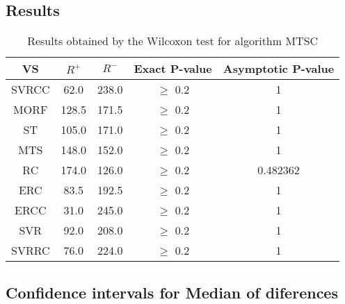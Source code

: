 \documentclass[a4paper,10pt]{article}
\begin{document}
\subsection{Results}

\begin{table}[!htp]
\centering\small
\begin{tabular}{
|c|c|c|c|c|}
\hline
 VS & $R^{+}$ & $R^{-}$ & Exact P-value & Asymptotic P-value \\ \hline 
SVRCC & 62.0 & 238.0 & $\geq$ 0.2 & 1\\ \hline 
MORF & 128.5 & 171.5 & $\geq$ 0.2 & 1\\ \hline 
ST & 105.0 & 171.0 & $\geq$ 0.2 & 1\\ \hline 
MTS & 148.0 & 152.0 & $\geq$ 0.2 & 1\\ \hline 
RC & 174.0 & 126.0 & $\geq$ 0.2 & 0.482362\\ \hline 
ERC & 83.5 & 192.5 & $\geq$ 0.2 & 1\\ \hline 
ERCC & 31.0 & 245.0 & $\geq$ 0.2 & 1\\ \hline 
SVR & 92.0 & 208.0 & $\geq$ 0.2 & 1\\ \hline 
SVRRC & 76.0 & 224.0 & $\geq$ 0.2 & 1\\ \hline 

\end{tabular}
\caption{Results obtained by the Wilcoxon test for algorithm MTSC}
\end{table}

\subsection{Confidence intervals for Median of diferences}
\end{document}
